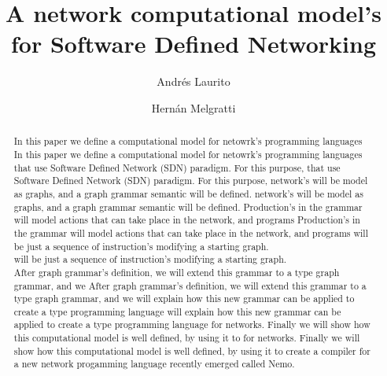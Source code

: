 \documentclass[envcountsect,runningheads]{llncs}
\title{A network computational model's \\ for Software Defined Networking}
\author{Andr\'es  Laurito\inst{1}  \and
        Hern\'an Melgratti\inst{2}}
\institute{
Departamento de Computac\'on - FCEN -UBA\\
 \email{andy.laurito@gmail.com} }
\begin{document}
\maketitle

\begin{abstract}
 In this paper we define a computational model for netowrk's programming languages 
 In this paper we define a computational model for netowrk's programming languages 
 that use Software Defined Network (SDN) paradigm. For this purpose, 
 that use Software Defined Network (SDN) paradigm. For this purpose, 
 network's will be model as graphs, and a graph grammar semantic will be defined. 
 network's will be model as graphs, and a graph grammar semantic will be defined. 
 Production's in the grammar will model actions that can take place in the network, and programs 
 Production's in the grammar will model actions that can take place in the network, and programs 
 will be just a sequence of instruction's modifying a starting graph. \\
 will be just a sequence of instruction's modifying a starting graph. \\
 After graph grammar's definition, we will extend this grammar to a type graph grammar, and we 
 After graph grammar's definition, we will extend this grammar to a type graph grammar, and we 
 will explain how this new grammar can be applied to create a type programming language 
 will explain how this new grammar can be applied to create a type programming language 
 for networks. Finally we will show how this computational model is well defined, by using it to 
 for networks. Finally we will show how this computational model is well defined, by using it to 
 create a compiler for a new network progamming language recently emerged called Nemo.
 \end{abstract}
\end{document}

